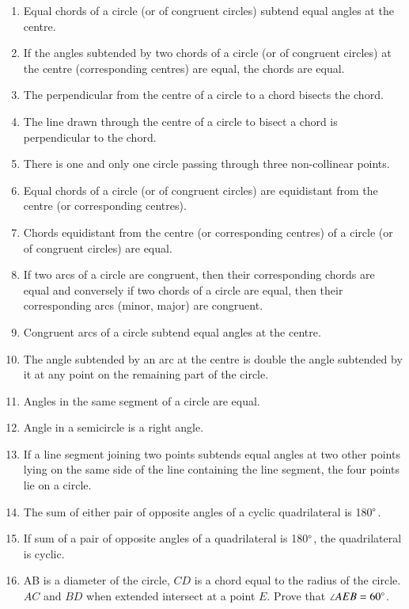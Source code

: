 \renewcommand{\theequation}{\theenumi}
\begin{enumerate}[label=\arabic*.,ref=\thesubsection.\theenumi]
\item  Equal chords of a circle (or of congruent circles) subtend equal angles at the centre. 
\item  If the angles subtended by two chords of a circle (or of congruent circles) at the centre (corresponding centres) are equal, the chords are equal.
\item  The perpendicular from the centre of a circle to a chord bisects the chord. 
\item  The line drawn through the centre of a circle to bisect a chord is perpendicular to the chord.
\item  There is one and only one circle passing through three non-collinear points. 
\item  Equal chords of a circle (or of congruent circles) are equidistant from the centre (or corresponding centres).
\item Chords equidistant from the centre (or corresponding centres) of a circle (or of congruent circles) are equal.
\item  If two arcs of a circle are congruent, then their corresponding chords are equal and conversely if two chords of a circle are equal, then their corresponding arcs (minor, major) are congruent.
\item Congruent arcs of a circle subtend equal angles at the centre. 
\item  The angle subtended by an arc at the centre is double the angle subtended by it at any point on the remaining part of the circle.
\item Angles in the same segment of a circle are equal. \item  Angle in a semicircle is a right angle. 
\item  If a line segment joining two points subtends equal angles at two other points lying on the same side of the line containing the line segment, the four points lie on a circle. 
\begin{enumerate}


\end{enumerate}
\item  The sum of either pair of opposite angles of a cyclic quadrilateral is 180$\degree$.
\item  If sum of a pair of opposite angles of a quadrilateral is 180$\degree$, the quadrilateral is cyclic.
%
\item AB is a diameter of the circle, $CD$ is a chord equal to the radius of the circle. $AC$ and $BD$ when extended intersect at a point $E$. Prove that $\angle AEB = 60\degree$.
\begin{enumerate}


\end{enumerate}


\end{enumerate}
